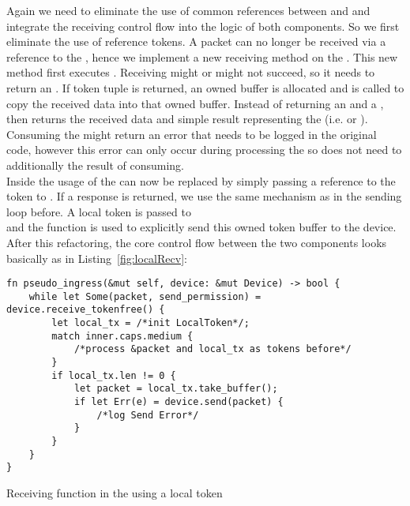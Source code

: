Again we need to eliminate the use of common references between \stack{} and \dev{} and integrate the receiving control flow into the  logic of both components. So we first eliminate the use of reference tokens. A packet can no longer be received via a reference to the \dev{}, hence we implement a new receiving method on the \dev{}. This new method  first executes . Receiving might or might not succeed, so it needs to return an . If token tuple is returned, an owned buffer is allocated and  is called to copy the received data into that owned buffer. Instead of returning an  and a ,  then returns the received data and simple result representing the  (i.e.  or ). Consuming the  might return an error that needs to be logged in the original code, however this error can only occur during processing the \stack{} so  does not need to additionally the result of consuming.  \\

Inside  the usage of the  can now be replaced by simply passing a reference to the token to . If a response is returned, we use the same mechanism as in the sending loop before. A local token is passed to \\  and the  function is used to explicitly send this owned token buffer to the device. After this refactoring, the core control flow between the two components looks basically as in Listing~\ref{fig:localRecv}:\\

\begin{codefigure}
\begin{verbatim}
fn pseudo_ingress(&mut self, device: &mut Device) -> bool {
    while let Some(packet, send_permission) = device.receive_tokenfree() {
        let local_tx = /*init LocalToken*/;
        match inner.caps.medium {
            /*process &packet and local_tx as tokens before*/
        }
        if local_tx.len != 0 {
            let packet = local_tx.take_buffer();
            if let Err(e) = device.send(packet) {
                /*log Send Error*/
            }
        }        
    }
}
\end{verbatim}
\caption{Receiving function in the \stack{} using a local token}
\label{fig:localRecv}
\end{codefigure}



